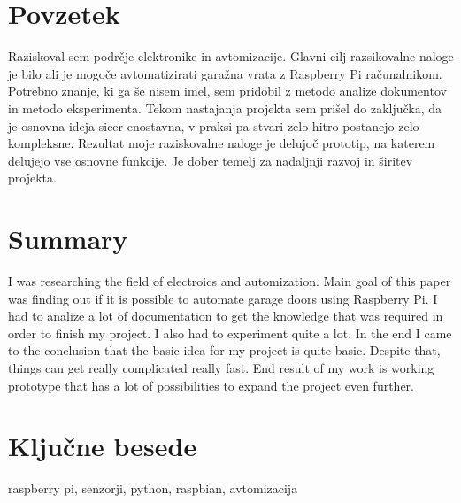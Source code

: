 \documentclass[11pt]{article}
\begin{document}
\newpage
\thispagestyle{empty}
\section*{Povzetek}
Raziskoval sem podrčje elektronike in avtomizacije. Glavni cilj razsikovalne naloge je bilo ali je mogoče avtomatizirati garažna vrata z Raspberry Pi računalnikom. Potrebno znanje, ki ga še nisem imel, sem pridobil z metodo analize dokumentov in metodo eksperimenta. Tekom nastajanja projekta sem prišel do zaključka, da je osnovna ideja sicer enostavna, v praksi pa stvari zelo hitro postanejo zelo kompleksne. Rezultat moje raziskovalne naloge je delujoč prototip, na katerem delujejo vse osnovne funkcije. Je dober temelj za nadaljnji razvoj in širitev projekta.
\section*{Summary}
I was researching the field of electroics and automization. Main goal of this paper was finding out if it is possible to automate garage doors using Raspberry Pi. I had to analize a lot of documentation to get the knowledge that was required in order to finish my project. I also had to experiment quite a lot. In the end I came to the conclusion that the basic idea for my project is quite basic. Despite that, things can get really complicated really fast. End result of my work is working prototype that has a lot of possibilities to expand the project even further.
\section*{Ključne besede}
raspberry pi, senzorji, python, raspbian, avtomizacija

\renewcommand{\baselinestretch}{0.90}\normalsize
\newpage
{}
\thispagestyle{empty}
\tableofcontents
\listoffigures
\renewcommand{\baselinestretch}{1.0}\normalsize
\newpage

\pagestyle{fancy}
\fancyhead{}
\fancyfoot{}
\fancyfoot[C]{\thepage}
\end{document}
